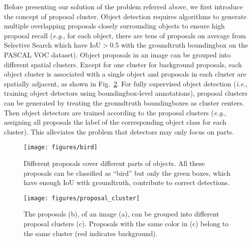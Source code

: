 \documentclass[10pt,journal,compsoc]{IEEEtran}
\def\eg{\emph{e.g}.} \def\Eg{\emph{E.g}.}
\def\ie{\emph{i.e}.} \def\Ie{\emph{I.e}.}
\begin{document}
Before presenting our solution of the problem referred above,
we first introduce the concept of proposal cluster.
Object detection requires algorithms to generate multiple overlapping proposals closely surrounding objects to ensure high proposal recall
(\eg, for each object, there are tens of proposals on average from Selective Search \cite{Ref:Uijlings2013} which have IoU$>$0.5 with the groundtruth boundingbox on the PASCAL VOC dataset).
Object proposals in an image can be grouped into different spatial clusters.
Except for one cluster for background proposals,
each object cluster is associated with a single object
and proposals in each cluster are spatially adjacent,
as shown in Fig.~\ref{fig:proposal_cluster}.
For fully supervised object detection
(\ie, training object detectors using boundingbox-level annotations), 
proposal clusters can be generated
by treating the groundtruth boundingboxes as cluster centers.
Then object detectors are trained according to the proposal clusters
(\eg, assigning all proposals the label of the corresponding object class for each cluster).
This alleviates the problem that detectors may only focus on parts.


\begin{figure}[t]
\begin{center}
   \texttt{[image: figures/bird]}
\end{center}
   \caption{Different proposals cover different parts of objects.
   All these proposals can be classified as ``bird''
   but only the green boxes, which have enough IoU with groundtruth, contribute to correct detections.
   }
\label{fig:bird}
\end{figure}

\begin{figure}[t]
\begin{center}
   \texttt{[image: figures/proposal\_cluster]}
\end{center}
   \caption{The proposals (b), of an image (a), can be grouped into different proposal clusters (c).
   Proposals with the same color in (c) belong to the same cluster (red indicates background).}
\label{fig:proposal_cluster}
\end{figure}
\end{document}
